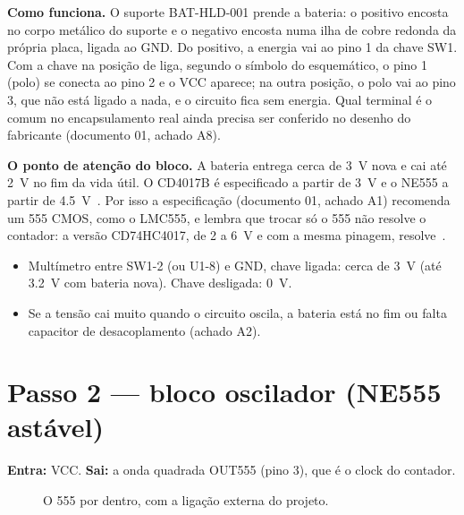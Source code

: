\documentclass[11pt,a4paper]{article}
\begin{document}
\textbf{Como funciona.} O suporte BAT-HLD-001 prende a bateria: o positivo encosta no
corpo metálico do suporte e o negativo encosta numa ilha de cobre redonda da própria
placa, ligada ao GND. Do positivo, a energia vai ao pino 1 da chave SW1. Com a chave na
posição de liga, segundo o símbolo do esquemático, o pino 1 (polo) se conecta ao pino 2 e
o VCC aparece; na outra posição, o polo vai ao pino 3, que não está ligado a nada, e o
circuito fica sem energia. Qual terminal é o comum no encapsulamento real ainda precisa
ser conferido no desenho do fabricante (documento 01, achado A8).

\textbf{O ponto de atenção do bloco.} A bateria entrega cerca de \SI{3}{\volt} nova e
cai até \SI{2}{\volt} no fim da vida útil. O CD4017B é especificado a partir de
\SI{3}{\volt} e o NE555 a partir de \SI{4,5}{\volt}~\cite{ne555,cd4017}. Por isso a
especificação (documento 01, achado A1) recomenda um 555 CMOS, como o LMC555, e
lembra que trocar só o 555 não resolve o contador: a versão CD74HC4017, de 2 a
\SI{6}{\volt} e com a mesma pinagem, resolve~\cite{hc4017}.

\begin{medir}
\begin{itemize}[leftmargin=*]
  \item Multímetro entre SW1-2 (ou U1-8) e GND, chave ligada: cerca de \SI{3}{\volt}
  (até \SI{3,2}{\volt} com bateria nova). Chave desligada: \SI{0}{\volt}.
  \item Se a tensão cai muito quando o circuito oscila, a bateria está no fim ou falta
  capacitor de desacoplamento (achado A2).
\end{itemize}
\end{medir}

\section{Passo 2 — bloco oscilador (NE555 astável)}
\begin{figure}[H]
\centering
\diagramaBlocos[todosapagados, b2/.style={destaque}]
\end{figure}

\textbf{Entra:} VCC. \textbf{Sai:} a onda quadrada OUT555 (pino 3), que é o clock do
contador.

\begin{figure}[H]
\centering
\neInterno
\caption{O 555 por dentro, com a ligação externa do projeto.}
\end{figure}
\end{document}
